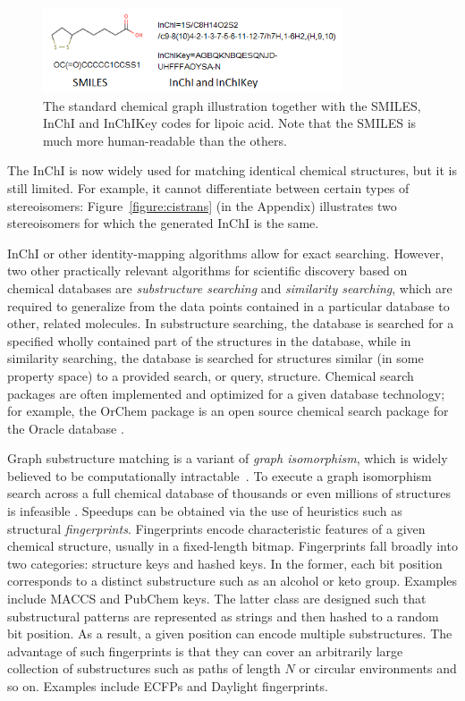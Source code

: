 \documentclass{sig-alternate}
\begin{document}
\begin{figure}
\centering
\includegraphics[height=1in]{lipoicacid.png}
\caption{The standard chemical graph illustration together with the SMILES, InChI and InChIKey codes for lipoic acid. Note that the SMILES is much more human-readable than the others.}
\label{figure:smiles}
\end{figure}

The InChI is now widely used for matching identical chemical
structures, but it is still limited. For example, it cannot
differentiate between certain types of stereoisomers:
Figure~\ref{figure:cistrans} (in the Appendix) illustrates two
stereoisomers for which the generated InChI is the same.

InChI or other identity-mapping algorithms allow for exact searching. However, two other
practically relevant algorithms for scientific discovery based on
chemical databases are \emph{substructure searching} and
\emph{similarity searching}, which are required to generalize from the
data points contained in a particular database to other, related
molecules. In substructure searching, the database is searched for a  
specified wholly contained part of the structures in the database,
while in similarity searching, the database is searched for structures
similar (in some property space) to a provided search, or query,
structure. Chemical search packages are often implemented and
optimized for a given database technology; for example, the OrChem
package is an open source chemical search package for the Oracle
database \cite{rijnbeek2009}.

Graph substructure matching is a variant of \emph{graph isomorphism},
which is widely believed to be computationally
intractable~\cite{cordella2001}. To execute a graph isomorphism search
across a full chemical database of thousands or even millions of
structures is infeasible \cite{Weininger:2011ly}. Speedups can be
obtained via the use of heuristics such as structural
\emph{fingerprints}. Fingerprints encode characteristic features of a
given chemical structure, usually in a fixed-length
bitmap. Fingerprints fall broadly into two categories: structure keys
and hashed keys. In the former, each bit position corresponds to a
distinct substructure such as an alcohol or keto group. Examples
include MACCS and PubChem keys. The latter class are designed such
that substructural patterns are represented as strings and then hashed
to a random bit position. As a result, a given position can encode
multiple substructures. The advantage of such fingerprints is that
they can cover an arbitrarily large collection of substructures such
as paths of length $N$ or circular environments and so on. Examples
include ECFPs and Daylight fingerprints.
\end{document}
